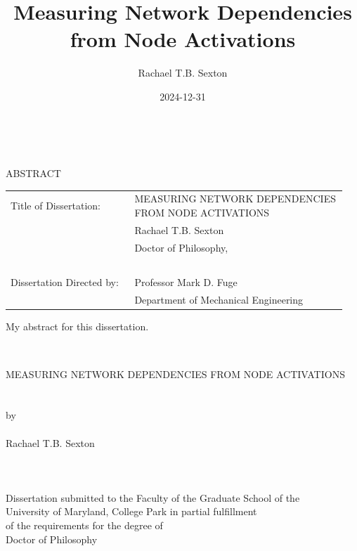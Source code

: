 \documentclass[%
	12pt,
		oneside,
		letterpaper
]{book}
\title{Measuring Network Dependencies from Node Activations}
\author{Rachael T.B. Sexton}
\date{2024-12-31}
\begin{document}
\pagestyle{empty}
\singlespacing

\hbox{\ }

\begin{center}
\large{{ABSTRACT}}

\vspace{3em}

\end{center}
\hspace{-.15in}
\begin{tabular}{p{0.35\linewidth}p{0.6\linewidth}}
Title of Dissertation:     & {\large \uppercase{Measuring Network
Dependencies from Node Activations}}\\
                           & {\large  Rachael T.B. Sexton } \\
                           & {\large Doctor of Philosophy, } \\
\                         \\
Dissertation Directed by:  & {\large Professor Mark D. Fuge } \\
                           & {\large Department of Mechanical
Engineering} \\
\end{tabular}

\vspace{3em}


\renewcommand{\baselinestretch}{2}
\large \normalsize
My abstract for this dissertation.\par
\clearpage%

\thispagestyle{empty} \hbox{\ } \vspace{1.5in}
\renewcommand{\baselinestretch}{1}
\small\normalsize
\begin{center}

\large{\uppercase{Measuring Network Dependencies from Node
Activations}}\\
\ \\ 
\ \\
\large{by} \\
\ \\
\large{Rachael T.B. Sexton}
\ \\
\ \\
\ \\
\ \\
\normalsize
Dissertation submitted to the Faculty of the Graduate School of the \\
University of Maryland, College Park in partial fulfillment \\
of the requirements for the degree of \\
Doctor of Philosophy \\

\end{center}
\end{document}
